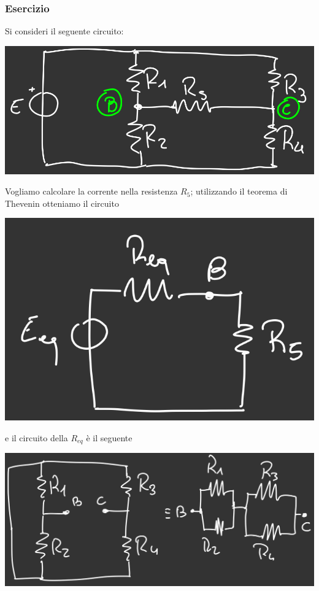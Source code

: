 \documentclass{article}
\begin{document}
\subsubsection{Esercizio}
Si consideri il seguente circuito:
\begin{center}
    \includegraphics[scale=0.3]{Image/Esercizio_Thevenin_1.png}
\end{center}
Vogliamo calcolare la corrente nella resistenza $R_5$; utilizzando il teorema di Thevenin otteniamo il circuito
\begin{center}
    \includegraphics[scale=0.3]{Image/Esercizio_Thevenin_2.png}
\end{center}
e il circuito della $R_{eq}$ è il seguente
\begin{center}
    \includegraphics[scale=0.3]{Image/Esercizio_Thevenin_3.png}
\end{center}
\end{document}
